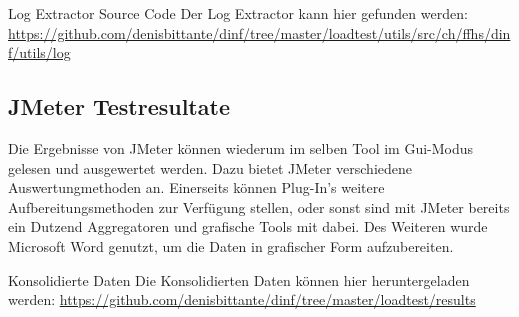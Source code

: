 \documentclass[main.tex]{subfiles}
\begin{document}
\begin{reference}{Log Extractor Source Code}
Der Log Extractor kann hier gefunden werden:  \url{https://github.com/denisbittante/dinf/tree/master/loadtest/utils/src/ch/ffhs/dinf/utils/log}
 
\end{reference}



\subsection{JMeter Testresultate}


Die Ergebnisse von JMeter können wiederum im selben Tool im Gui-Modus gelesen und ausgewertet werden. Dazu bietet JMeter verschiedene Auswertungmethoden an. Einerseits können Plug-In’s weitere Aufbereitungsmethoden zur Verfügung stellen, oder sonst sind mit JMeter bereits ein Dutzend Aggregatoren und grafische Tools mit dabei. Des Weiteren wurde Microsoft Word genutzt, um die Daten in grafischer Form aufzubereiten.

\begin{reference}{Konsolidierte Daten}
Die Konsolidierten Daten können hier heruntergeladen werden:  \url{https://github.com/denisbittante/dinf/tree/master/loadtest/results}
 
\end{reference}
\end{document}
